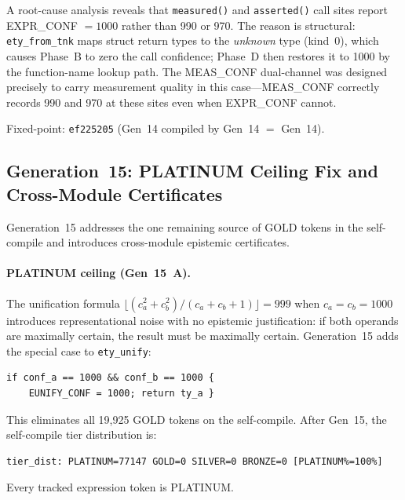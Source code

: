 \documentclass[acmsmall,screen,review,anonymous]{acmart}
\begin{document}
A root-cause analysis reveals that \texttt{measured()} and \texttt{asserted()}
call sites report EXPR\_CONF $= 1000$ rather than 990 or 970.
The reason is structural: \texttt{ety\_from\_tnk} maps struct return types to
the \emph{unknown} type (kind~0), which causes Phase~B to zero the call
confidence; Phase~D then restores it to 1000 by the function-name lookup path.
The MEAS\_CONF dual-channel was designed precisely to carry measurement quality
in this case---MEAS\_CONF correctly records 990 and 970 at these sites even
when EXPR\_CONF cannot.

Fixed-point: \texttt{ef225205} (Gen~14 compiled by Gen~14 $=$ Gen~14).

\subsection{Generation~15: PLATINUM Ceiling Fix and Cross-Module Certificates}
\label{sec:gen15}

Generation~15 addresses the one remaining source of GOLD tokens in the
self-compile and introduces cross-module epistemic certificates.

\paragraph{PLATINUM ceiling (Gen~15~A).}
The unification formula $\lfloor(c_a^2+c_b^2)/(c_a+c_b+1)\rfloor = 999$
when $c_a = c_b = 1000$ introduces representational noise with no
epistemic justification: if both operands are maximally certain, the
result must be maximally certain.
Generation~15 adds the special case to \texttt{ety\_unify}:
\begin{verbatim}
if conf_a == 1000 && conf_b == 1000 {
    EUNIFY_CONF = 1000; return ty_a }
\end{verbatim}
This eliminates all 19,925 GOLD tokens on the self-compile.
After Gen~15, the self-compile tier distribution is:
\begin{verbatim}
tier_dist: PLATINUM=77147 GOLD=0 SILVER=0 BRONZE=0 [PLATINUM%=100%]
\end{verbatim}
Every tracked expression token is PLATINUM.
\end{document}
